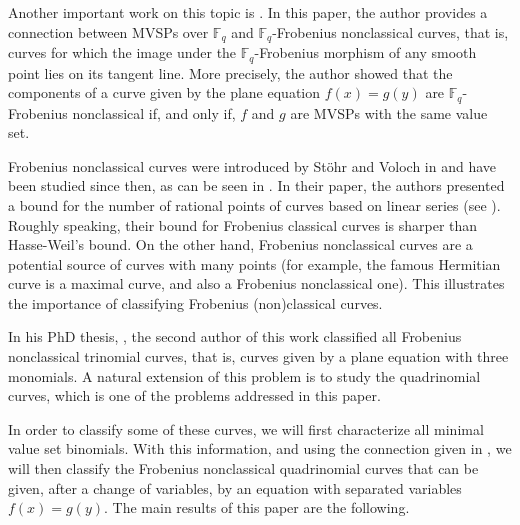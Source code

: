 \documentclass[preprint,12pt]{elsarticle}
\begin{document}
Another important work on this topic is \cite{borges-separated}. In this paper, the author provides a connection between MVSPs over $\mathbb{F}_q$ and $\mathbb{F}_q$-Frobenius nonclassical curves, that is, curves for which the image under the $\mathbb{F}_q$-Frobenius morphism of any smooth point lies on its tangent line. More precisely, the author showed that the components of a curve given by the plane equation $f(x) = g(y)$ are $\mathbb{F}_q$-Frobenius nonclassical if, and only if, $f$ and $g$ are MVSPs with the same value set.

Frobenius nonclassical curves were introduced by Stöhr and Voloch in \cite{StohrVol} and have been studied since then, as can be seen in \cite{borges, borges-homma, hefez}. In their paper, the authors presented a bound for the number of rational points of curves based on linear series (see \cite[Corollary 2.14]{StohrVol}). Roughly speaking, their bound for Frobenius classical curves is sharper than Hasse-Weil's bound. On the other hand, Frobenius nonclassical curves are a potential source of curves with many points (for example, the famous Hermitian curve is a maximal curve, and also a Frobenius nonclassical one). This illustrates the importance of classifying Frobenius (non)classical curves.

In his PhD thesis, \cite{guardieiro}, the second author of this work classified all Frobenius nonclassical trinomial curves, that is, curves given by a plane equation with three monomials. A natural extension of this problem is to study the quadrinomial curves, which is one of the problems addressed in this paper.

In order to classify some of these curves, we will first characterize all minimal value set binomials. With this information, and using the connection given in \cite{borges-separated}, we will then classify the Frobenius nonclassical quadrinomial curves that can be given, after a change of variables, by an equation with separated variables $f(x) = g(y)$. The main results of this paper are the following.
\\
\end{document}
